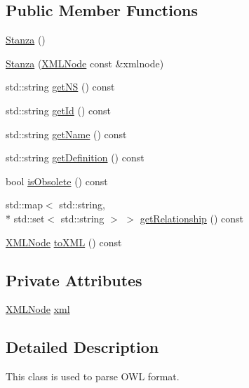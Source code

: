 \subsection*{Public Member Functions}
\begin{DoxyCompactItemize}
\item 
\hyperlink{classunisys_1_1Stanza_af4d5522f64efbc7b1d2a88e73528e076}{Stanza} ()
\item 
\hyperlink{classunisys_1_1Stanza_a3b6c24498924ef1724eeeb8119476166}{Stanza} (\hyperlink{structXMLNode}{X\-M\-L\-Node} const \&xmlnode)
\item 
std\-::string \hyperlink{classunisys_1_1Stanza_a1a75f15dcb757e71475b660405155b1c}{get\-N\-S} () const 
\item 
std\-::string \hyperlink{classunisys_1_1Stanza_a969c676a554f226392904cbc9178df98}{get\-Id} () const 
\item 
std\-::string \hyperlink{classunisys_1_1Stanza_a2204e5472efcc6df401092120a234f8e}{get\-Name} () const 
\item 
std\-::string \hyperlink{classunisys_1_1Stanza_a1fe61d49f52fdba3f7aa5e52864a969c}{get\-Definition} () const 
\item 
bool \hyperlink{classunisys_1_1Stanza_ac4e1ce29ee8dd7f8802fe1ba75f23091}{is\-Obsolete} () const 
\item 
std\-::map$<$ std\-::string, \\*
std\-::set$<$ std\-::string $>$ $>$ \hyperlink{classunisys_1_1Stanza_a242d234710c2c2c3c3a95b16770dcfe9}{get\-Relationship} () const 
\item 
\hyperlink{structXMLNode}{X\-M\-L\-Node} \hyperlink{classunisys_1_1Stanza_a32b203676c419edbba4d6802e1112c9b}{to\-X\-M\-L} () const 
\end{DoxyCompactItemize}
\subsection*{Private Attributes}
\begin{DoxyCompactItemize}
\item 
\hyperlink{structXMLNode}{X\-M\-L\-Node} \hyperlink{classunisys_1_1Stanza_a870ed1c71abd0aab78cd86be1c0c0473}{xml}
\end{DoxyCompactItemize}


\subsection{Detailed Description}
This class is used to parse O\-W\-L format. 

